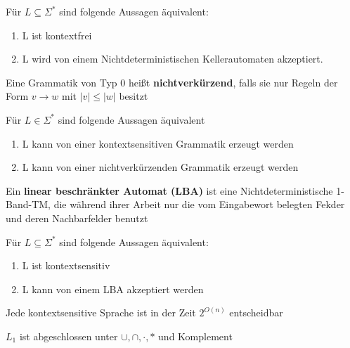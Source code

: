 \documentclass[14pt]{article}
\begin{document}
\begin{eigenschaft}
    Für $L \subseteq \varSigma^*$ sind folgende Aussagen äquivalent:
    \begin{enumerate}
        \item L ist kontextfrei
        \item L wird von einem Nichtdeterministischen Kellerautomaten
        akzeptiert.
    \end{enumerate}
\end{eigenschaft}
\begin{definition} 
    Eine Grammatik von Typ 0 heißt \textbf{nichtverkürzend}, falls sie nur Regeln
    der Form $v \rightarrow w$ mit $|v| \leq |w|$ besitzt
\end{definition}
\begin{eigenschaft}
    Für $L \in \varSigma^*$ sind folgende Aussagen äquivalent
    \begin{enumerate}
        \item L kann von einer kontextsensitiven Grammatik erzeugt werden
        \item L kann von einer nichtverkürzenden Grammatik erzeugt werden
    \end{enumerate}
\end{eigenschaft}
\begin{definition}
    Ein \textbf{linear beschränkter Automat (LBA)} ist eine Nichtdeterministische
    1-Band-TM, die während ihrer Arbeit nur die vom Eingabewort belegten Fekder
    und deren Nachbarfelder benutzt
\end{definition}
\begin{eigenschaft}
    Für $L \subseteq \varSigma^*$ sind folgende Aussagen äquivalent:
    \begin{enumerate}
        \item L ist kontextsensitiv
        \item L kann von einem LBA akzeptiert werden
    \end{enumerate}
\end{eigenschaft}
\begin{eigenschaft}
    Jede kontextsensitive Sprache ist in der Zeit $2^{O(n)}$ entscheidbar
\end{eigenschaft}
\begin{eigenschaft}
    $L_1$ ist abgeschlossen unter $\cup, \cap, \cdot,*$ und Komplement 
\end{eigenschaft}
\end{document}
